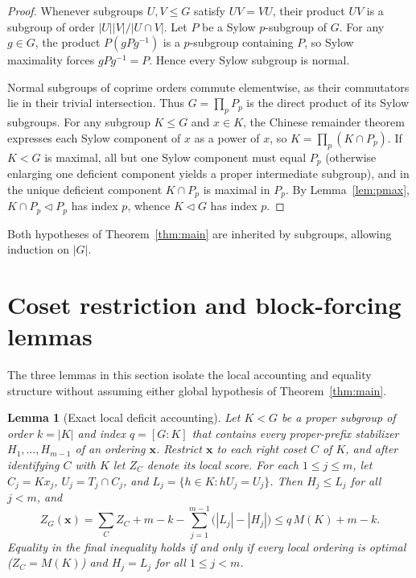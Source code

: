 \documentclass[11pt,reqno]{amsart}
\numberwithin{equation}{section}
\newtheorem{lemma}[theorem]{Lemma}
\theoremstyle{definition}
\theoremstyle{remark}
\begin{document}
\begin{proof}
Whenever subgroups $U,V\le G$ satisfy $UV=VU$, their product $UV$ is a subgroup of order $|U||V|/|U\cap V|$. Let $P$ be a Sylow $p$-subgroup of $G$. For any $g\in G$, the product $P(gPg^{-1})$ is a $p$-subgroup containing $P$, so Sylow maximality forces $gPg^{-1}=P$. Hence every Sylow subgroup is normal.

Normal subgroups of coprime orders commute elementwise, as their commutators lie in their trivial intersection. Thus $G=\prod_p P_p$ is the direct product of its Sylow subgroups. For any subgroup $K\le G$ and $x\in K$, the Chinese remainder theorem expresses each Sylow component of $x$ as a power of $x$, so $K=\prod_p (K\cap P_p)$. If $K<G$ is maximal, all but one Sylow component must equal $P_p$ (otherwise enlarging one deficient component yields a proper intermediate subgroup), and in the unique deficient component $K\cap P_p$ is maximal in $P_p$. By Lemma~\ref{lem:pmax}, $K\cap P_p\lhd P_p$ has index $p$, whence $K\lhd G$ has index $p$.
\end{proof}

Both hypotheses of Theorem~\ref{thm:main} are inherited by subgroups, allowing induction on $|G|$.

\section{Coset restriction and block-forcing lemmas}
\label{sec:coset}

The three lemmas in this section isolate the local accounting and equality structure without assuming either global hypothesis of Theorem~\ref{thm:main}.

\begin{lemma}[Exact local deficit accounting]
\label{lem:local}
Let $K<G$ be a proper subgroup of order $k=|K|$ and index $q=[G:K]$ that contains every proper-prefix stabilizer $H_1,\ldots,H_{m-1}$ of an ordering $\mathbf{x}$. Restrict $\mathbf{x}$ to each right coset $C$ of $K$, and after identifying $C$ with $K$ let $Z_C$ denote its local score. For each $1\le j\le m$, let $C_j = Kx_j$, $U_j = T_j\cap C_j$, and $L_j = \{h\in K : hU_j = U_j\}$. Then $H_j\le L_j$ for all $j<m$, and
\begin{equation}
\label{eq:local-id}
Z_G(\mathbf{x})
= \sum_{C} Z_C + m - k - \sum_{j=1}^{m-1} \bigl(|L_j|-|H_j|\bigr)
\le q\,M(K) + m - k.
\end{equation}
Equality in the final inequality holds if and only if every local ordering is optimal ($Z_C=M(K)$) and $H_j=L_j$ for all $1\le j<m$.
\end{lemma}
\end{document}
